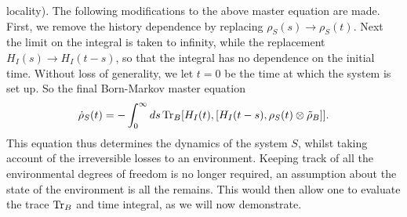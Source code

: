 \documentclass[11pt,a4paper,article,oneside]{memoir}
\begin{document}
locality). The following modifications to the above master equation
are made. First, we remove the history dependence by replacing
$\rho_S(s)\rightarrow\rho_S(t)$. Next the limit on the integral is
taken to infinity, while the replacement $H_I(s)\rightarrow H_I(t-s)$,
so that the integral has no dependence on the initial time.  Without
loss of generality, we let $t=0$ be the time at which the system is
set up. So the final Born-Markov master equation
\begin{equation}
  \dot{\rho}_S(t)=-\int^\infty_0ds\operatorname{Tr}_B[H_I(t),[H_I(t-s),\rho_S(t)\otimes\tilde{\rho}_B]].
  \label{eqn:bornmark}
\end{equation}
This equation thus determines the dynamics of the system $S$, whilst
taking account of the irreversible losses to an environment. Keeping
track of all the environmental degrees of freedom is no longer
required, an assumption about the state of the environment is all the
remains. This would then allow one to evaluate the trace $\operatorname{Tr}_B$ and
time integral, as we will now demonstrate.
\end{document}
